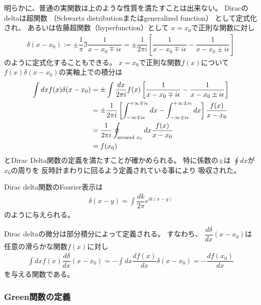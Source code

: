 明らかに、普通の実関数は上のような性質を満たすことは出来ない。
Diracのdeltaは超関数
（Schwartz distributionまたはgeneralized function）
として定式化され、
あるいは佐藤超関数（hyperfunction）として
$x = x_0$で正則な関数に対し
\begin{align}
    \delta(x - x_0)
:=
    \pm
    \dfrac{1}{\pi}
    \Im
    \dfrac{1}{x - x_0 \mp i \epsilon}
=
    \pm
    \dfrac{1}{2 \pi i}
    \left[
        \dfrac{1}{x - x_0 \mp i \epsilon}
        -
        \dfrac{1}{x - x_0 \pm i \epsilon}
    \right]
\end{align}
のように定式化することもできる。
$x = x_0$で正則な関数$f(x)$について
$f(x) \delta(x - x_0)$の実軸上での積分は
\begin{align}
    \int dx
    f(x) \delta(x - x_0)
&=
    \pm
    \int
    \dfrac{dx}{2 \pi i}
    f(x)
    \left[
        \dfrac{1}{x - x_0 \mp i \epsilon}
        -
        \dfrac{1}{x - x_0 \pm i \epsilon}
    \right]
\notag\\&
=
    \pm
    \dfrac{1}{2 \pi i}
    \left[
    \int_{- \infty \mp i \epsilon}
        ^{+ \infty \mp i \epsilon}
        dx
    -
    \int_{- \infty \pm i \epsilon}
        ^{+ \infty \pm i \epsilon}
        dx
    \right]
    \dfrac{f(x)}{x - x_0}
\notag\\&
=
    \dfrac{1}{2 \pi i}
    \oint_{\text{around } x_0}
        dx
    \dfrac{f(x)}{x - x_0}
\notag\\&
=
    f(x_0)
\end{align}
とDirac Delta関数の定義を満たすことが確かめられる。
特に係数の$\pm$は
$\oint dx$が$x_0$の周りを
反時計まわりに回るよう定義されている事により
吸収された。

Dirac delta関数のFourier表示は
\begin{align}
    \delta(x-y)
    =
    \int
    \dfrac{dk}{2\pi}
    e^{ik(x-y)}
\label{dirac delta fourier representation}
\end{align}
のように与えられる。

Dirac deltaの微分は部分積分によって定義される。
すなわち、
$\dfrac{d \delta}{dx}
    (x - x_0)$は
任意の滑らかな関数$f(x)$に対し
\begin{align}
    \int dx
    f(x)
    \dfrac{d \delta}{dx}
    (x - x_0)
=
    -
    \int dx
    \dfrac{d f(x)}{dx}
    \delta(x - x_0)
=
    -
    \dfrac{d f(x_0)}{dx}
\end{align}
を与える関数である。

\subsubsection{Green関数の定義}


